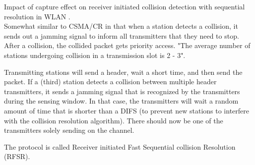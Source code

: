 Impact of capture effect on receiver initiated collision detection with sequential resolution in WLAN \cite{jibukumar2015}.\\

Somewhat similar to CSMA/CR in that when a station detects a collision, it sends out a jamming signal to inform all transmitters that they need to stop. After a collision, the collided packet gets priority access. "The average number of stations undergoing collision in a transmission slot is 2 - 3".

Transmitting stations will send a header, wait a short time, and then send the packet. If a (third) station detects a collision between multiple header transmitters, it sends a jamming signal that is recognized by the transmitters during the sensing window. In that case, the transmitters will wait a random amount of time that is shorter than a DIFS (to prevent new stations to interfere with the collision resolution algorithm). There should now be one of the transmitters solely sending on the channel.

The protocol is called Receiver initiated Fast Sequential collision Resolution (RFSR).
